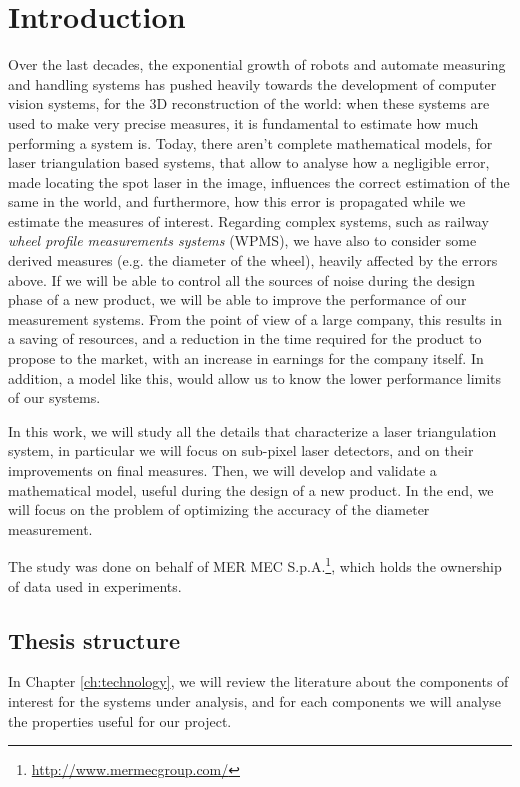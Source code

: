 \chapter{Introduction}

Over the last decades, the exponential growth of robots and automate measuring and handling systems has pushed heavily towards the development of computer vision systems, for the 3D reconstruction of the world: when these systems are used to make very precise measures, it is fundamental to estimate how much performing a system is. Today, there aren't complete mathematical models, for laser triangulation based systems, that allow to analyse how a negligible error, made locating the spot laser in the image, influences the correct estimation of the same in the world, and furthermore, how this error is propagated while we estimate the measures of interest. Regarding complex systems, such as railway \textit{wheel profile measurements systems} (\acs{WPMS}), we have also to consider some derived measures (e.g. the diameter of the wheel), heavily affected by the errors above. If we will be able to control all the sources of noise during the design phase of a new product, we will be able to improve the performance of our measurement systems. From the point of view of a large company, this results in a saving of resources, and a reduction in the time required for the product to propose to the market, with an increase in earnings for the company itself. In addition, a model like this, would allow us to know the lower performance limits of our systems.

In this work, we will study all the details that characterize a laser triangulation system, in particular we will focus on sub-pixel laser detectors, and on their improvements on final measures. Then, we will develop and validate a mathematical model, useful during the design of a new product. In the end, we will focus on the problem of optimizing the accuracy of the diameter measurement.

The study was done on behalf of MER MEC S.p.A.\footnote{\url{http://www.mermecgroup.com/}}, which holds the ownership of data used in experiments.

\section{Thesis structure}
In Chapter \ref{ch:technology}, we will review the literature about the components of interest for the systems under analysis, and for each components we will analyse the properties useful for our project.

